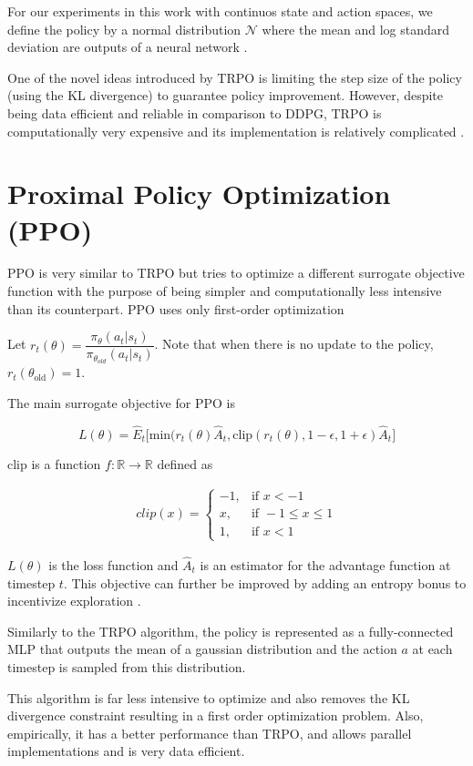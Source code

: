 For our experiments in this work with continuos state and action spaces, we define the policy by a normal distribution
$\mathcal{N}$ where the mean and log standard deviation are outputs of a neural network \cite{TRPO}.

One of the novel ideas introduced by TRPO is limiting the step size of the policy (using the KL divergence) to guarantee policy improvement. 
However, despite being data efficient and reliable in comparison to DDPG, TRPO is computationally very expensive
 and its implementation is relatively complicated \cite{PPO}.

\section{Proximal Policy Optimization (PPO)}

PPO is very similar to TRPO but tries to optimize a different surrogate objective function \cite{PPO} with the purpose of being simpler and
computationally less intensive than its counterpart. PPO uses only first-order optimization

Let $r_t(\theta) = \dfrac{\pi_{\theta}(a_t \vert s_t)}{\pi_{\theta_{old}}(a_t \vert s_t)}$. Note that when there is no update to the policy,
$r_t({\theta_{\text{old}}}) = 1$.

The main surrogate objective for PPO is

\begin{equation}
    L(\theta) = \hat{E}_t\big[\text{min}(r_t(\theta)\hat{A}_t, \text{clip}(r_t(\theta), 1 - \epsilon, 1 + \epsilon)\hat{A}_t\big]
\end{equation}

$\text{clip}$ is a function $f : \mathbb{R} \rightarrow \mathbb{R}$ defined as

\begin{align*}
    clip(x) = \begin{cases}
        -1, & \mbox{if } x < -1 \\
        x, & \mbox{if } -1 \leq x \leq 1 \\
        1, & \mbox{if } x < 1
        \end{cases}
\end{align*}

$L(\theta)$ is the loss function and  $\hat{A}_t$ is an estimator for the advantage function
at timestep $t$. This objective can further be improved by adding an entropy bonus to incentivize exploration \cite{REINFORCE, A3C}.

Similarly to the TRPO algorithm,
the policy is represented as a fully-connected MLP that outputs the mean of a gaussian distribution and
the action $a$ at each timestep is sampled from this distribution.

This algorithm is far less intensive to optimize and also removes the KL divergence constraint resulting in a
first order optimization problem.
Also, empirically, it has a better performance than TRPO, and allows parallel implementations and is very data efficient.